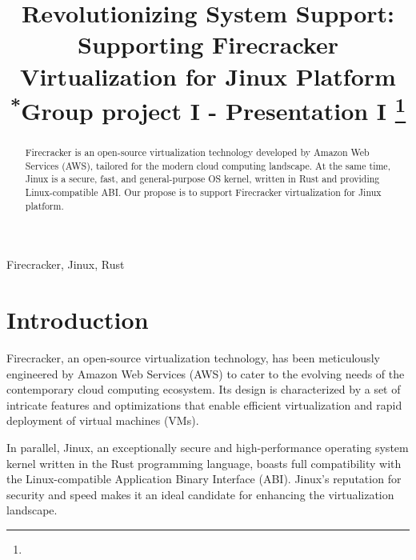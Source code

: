 \documentclass[conference]{IEEEtran}
\begin{document}
\title{Revolutionizing System Support: Supporting Firecracker Virtualization for Jinux Platform\\
{\footnotesize \textsuperscript{*}Group project I - Presentation I}
\thanks{}
}

\author{
\and
{}
}

\maketitle

\begin{abstract}
Firecracker is an open-source virtualization technology developed by Amazon Web Services (AWS), tailored for the modern cloud computing landscape. At the same time, Jinux is a secure, fast, and general-purpose OS kernel, written in Rust and providing Linux-compatible ABI. Our propose is to support Firecracker virtualization for Jinux platform.
\end{abstract}

\begin{IEEEkeywords}
Firecracker, Jinux, Rust
\end{IEEEkeywords}

\section{Introduction}
Firecracker, an open-source virtualization technology, has been meticulously engineered by Amazon Web Services (AWS) to cater to the evolving needs of the contemporary cloud computing ecosystem. Its design is characterized by a set of intricate features and optimizations that enable efficient virtualization and rapid deployment of virtual machines (VMs).

In parallel, Jinux, an exceptionally secure and high-performance operating system kernel written in the Rust programming language, boasts full compatibility with the Linux-compatible Application Binary Interface (ABI). Jinux's reputation for security and speed makes it an ideal candidate for enhancing the virtualization landscape.
\end{document}
